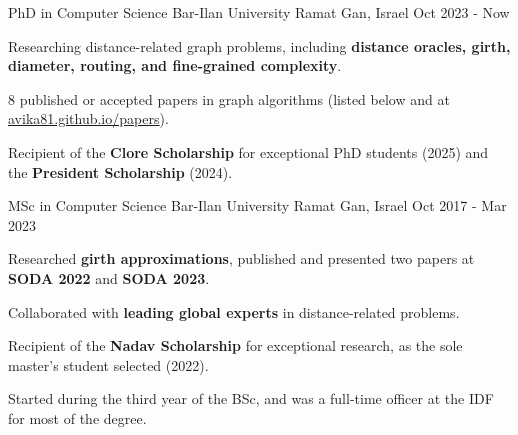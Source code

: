 \providecommand{\pubsnote}{listed below and at}


\begin{cventries}

  \cventry
    {PhD in Computer Science} %
    {Bar-Ilan University} %
    {Ramat Gan, Israel} %
    {Oct 2023 - Now} %
    {
      \begin{cvitems} %
        \item {Researching distance-related graph problems, including \textbf{distance oracles, girth, diameter, routing, and fine-grained complexity}.}
        \item {8 published or accepted papers in graph algorithms (\pubsnote{} \href{https://avika81.github.io/papers/}{\underline{avika81.github.io/papers}}).}
        \item {Recipient of the \textbf{Clore Scholarship} for exceptional PhD students (2025) and the \textbf{President Scholarship} (2024).}
      \end{cvitems}
    }
  
  \cventry
    {MSc in Computer Science} %
    {Bar-Ilan University} %
    {Ramat Gan, Israel} %
    {Oct 2017 - Mar 2023} %
    {
      \begin{cvitems} %
        \item {Researched \textbf{girth approximations}, published and presented two papers at \textbf{SODA 2022} and \textbf{SODA 2023}.}
        \item {Collaborated with \textbf{leading global experts} in distance-related problems. }
        \item {Recipient of the \textbf{Nadav Scholarship} for exceptional research, as the sole master's student selected (2022).}
        \item {Started during the third year of the BSc, and was a full-time officer at the IDF for most of the degree.}
      \end{cvitems}
    }
    

\end{cventries}
